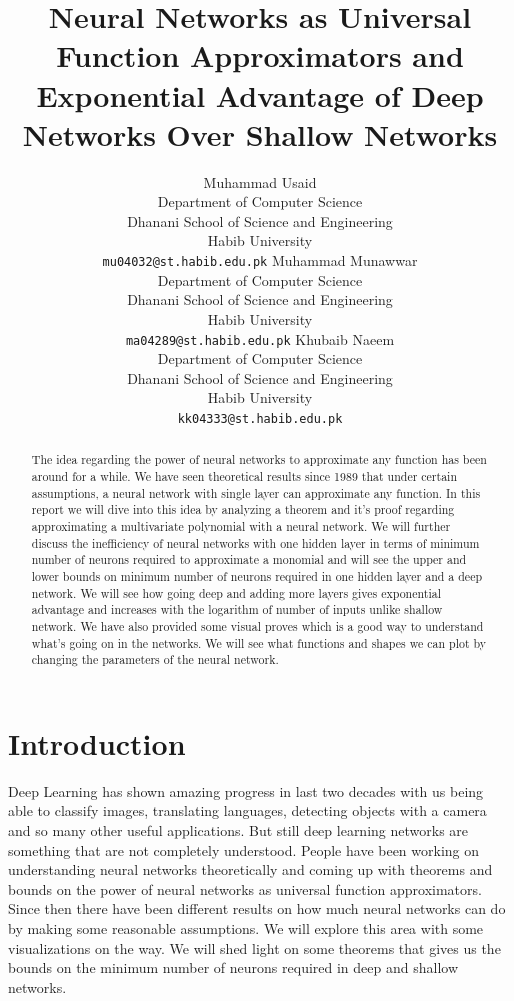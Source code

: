 \documentclass{article}
\title{Neural Networks as Universal Function Approximators and Exponential Advantage of Deep Networks Over Shallow Networks}
\author{%
  Muhammad Usaid \\
  Department of Computer Science\\
  Dhanani School of Science and Engineering \\
  Habib University\\
  \texttt{mu04032@st.habib.edu.pk}
  \And 
  Muhammad Munawwar \\
  Department of Computer Science\\
  Dhanani School of Science and Engineering \\
  Habib University\\
  \texttt{ma04289@st.habib.edu.pk}
  \And 
  Khubaib Naeem \\
  Department of Computer Science\\
    Dhanani School of Science and Engineering \\
    Habib University\\
  \texttt{kk04333@st.habib.edu.pk}
}
\begin{document}

\maketitle

\begin{abstract}
    The idea regarding the power of neural networks to approximate any function has been around for a while. We have seen theoretical results since 1989 that under certain assumptions, a neural network with single layer can approximate any function. In this report we will dive into this idea by analyzing a theorem and it's proof regarding approximating a multivariate polynomial with a neural network. We will further discuss the inefficiency of neural networks with one hidden layer in terms of minimum number of neurons required to approximate a monomial and will see the upper and lower bounds on minimum number of neurons required in one hidden layer and a deep network. We will see how going deep and adding more layers gives exponential advantage and increases with the logarithm of number of inputs unlike shallow network. We have also provided some visual proves which is a good way to understand what's going on in the networks. We will see what functions and shapes we can plot by changing the parameters of the neural network.
\end{abstract}

\section{Introduction}
Deep Learning has shown amazing progress in last two decades with us being able to classify images, translating languages, detecting objects with a camera and so many other useful applications. But still deep learning networks are something that are not completely understood. People have been working on understanding neural networks theoretically and coming up with theorems and bounds on the power of neural networks as universal function approximators. Since then there have been different results on how much neural networks can do by making some reasonable assumptions. We will explore this area with some visualizations on the way. We will shed light on some theorems that gives us the bounds on the minimum number of neurons required in deep and shallow networks.
\end{document}
